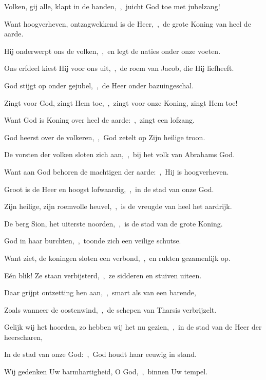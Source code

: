 \documentclass[12pt,twoside,a5paper]{article}
\begin{document}
\begin{halfparskip}
   Volken, gij alle, klapt in de handen,~\sep\ juicht God toe met jubelzang!


  Want hoogverheven, ontzagwekkend is de Heer,~\sep\ de grote Koning van heel de aarde.

  Hij onderwerpt ons de volken,~\sep\ en legt de naties onder onze voeten.

  Ons erfdeel kiest Hij voor ons uit,~\sep\ de roem van Jacob, die Hij liefheeft.

  God stijgt op onder gejubel,~\sep\ de Heer onder bazuingeschal.

  Zingt voor God, zingt Hem toe,~\sep\ zingt voor onze Koning, zingt Hem toe!

  Want God is Koning over heel de aarde:~\sep\ zingt een lofzang.

  God heerst over de volkeren,~\sep\ God zetelt op Zijn heilige troon.

  De vorsten der volken sloten zich aan,~\sep\ bij het volk van Abrahams God.

  Want aan God behoren de machtigen der aarde:~\sep\ Hij is hoogverheven.

   Groot is de Heer en hoogst lofwaardig,~\sep\ in de stad van onze God.

  Zijn heilige, zijn roemvolle heuvel,~\sep\ is de vreugde van heel het aardrijk.

  De berg Sion, het uiterste noorden,~\sep\ is de stad van de grote Koning.

  God in haar burchten,~\sep\ toonde zich een veilige schutse.

  Want ziet, de koningen sloten een verbond,~\sep\ en rukten gezamenlijk op.

  Eén blik! Ze staan verbijsterd,~\sep\ ze sidderen en stuiven uiteen.

  Daar grijpt ontzetting hen aan,~\sep\ smart als van een barende,

  Zoals wanneer de oostenwind,~\sep\ de schepen van Tharsis verbrijzelt.

  Gelijk wij het hoorden, zo hebben wij het nu gezien,~\sep\ in de stad van de Heer der heerscharen,

  In de stad van onze God:~\sep\ God houdt haar eeuwig in stand.

  Wij gedenken Uw barmhartigheid, O God,~\sep\ binnen Uw tempel.


\end{halfparskip}
\end{document}

